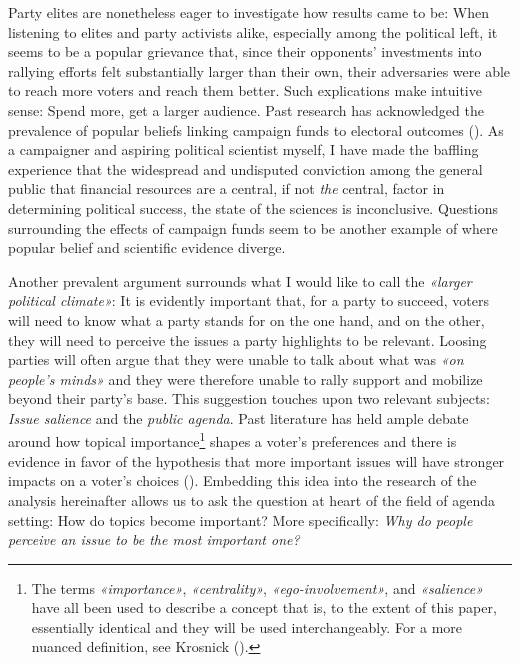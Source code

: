 \documentclass[11pt,a4paper]{article}
\begin{document}
Party elites are nonetheless eager to investigate how results came to be: When listening to elites and party activists alike, especially among the political left, it seems to be a popular grievance that, since their opponents’ investments into rallying efforts felt substantially larger than their own, their adversaries were able to reach more voters and reach them better. Such explications make intuitive sense: Spend more, get a larger audience. Past research has acknowledged the prevalence of popular beliefs linking campaign funds to electoral outcomes (\cite{scott_money_2015, sorauf_inside_1992}). As a campaigner and aspiring political scientist myself, I have made the baffling experience that the widespread and undisputed conviction among the general public that financial resources are a central, if not \textit{the} central, factor in determining political success, the state of the sciences is inconclusive. Questions surrounding the effects of campaign funds seem to be another example of where popular belief and scientific evidence diverge.

Another prevalent argument surrounds what I would like to call the \textit{«larger political climate»}: It is evidently important that, for a party to succeed, voters will need to know what a party stands for on the one hand, and on the other, they will need to perceive the issues a party highlights to be relevant. Loosing parties will often argue that they were unable to talk about what was \textit{«on people’s minds»} and they were therefore unable to rally support and mobilize beyond their party’s base. This suggestion touches upon two relevant subjects: \textit{Issue salience} and the \textit{public agenda}. Past literature has held ample debate around how topical importance\footnote{The terms \textit{«importance»}, \textit{«centrality»}, \textit{«ego-involvement»}, and \textit{«salience»} have all been used to describe a concept that is, to the extent of this paper, essentially identical and they will be used interchangeably. For a more nuanced definition, see Krosnick (\citeyear{krosnick_role_1988}).} shapes a voter’s preferences and there is evidence in favor of the hypothesis that more important issues will have stronger impacts on a voter’s choices (\cite{krosnick_role_1988, krosnick_government_1990}). Embedding this idea into the research of the analysis hereinafter allows us to ask the question at heart of the field of agenda setting: How do topics become important? More specifically: \textit{Why do people perceive an issue to be the most important one?}
\end{document}
